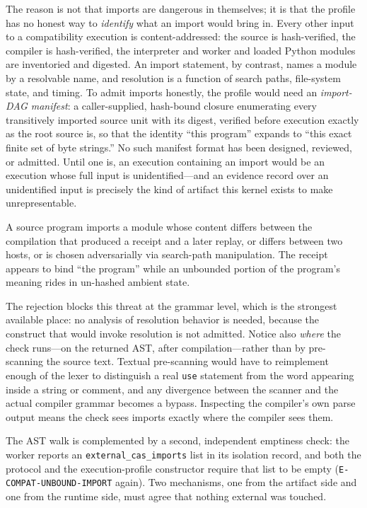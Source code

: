 The reason is not that imports are dangerous in themselves; it is that the profile has no honest way to \emph{identify} what an import would bring in. Every other input to a compatibility execution is content-addressed: the source is hash-verified, the compiler is hash-verified, the interpreter and worker and loaded Python modules are inventoried and digested. An import statement, by contrast, names a module by a resolvable name, and resolution is a function of search paths, file-system state, and timing. To admit imports honestly, the profile would need an \emph{import-DAG manifest}: a caller-supplied, hash-bound closure enumerating every transitively imported source unit with its digest, verified before execution exactly as the root source is, so that the identity ``this program'' expands to ``this exact finite set of byte strings.'' No such manifest format has been designed, reviewed, or admitted. Until one is, an execution containing an import would be an execution whose full input is unidentified---and an evidence record over an unidentified input is precisely the kind of artifact this kernel exists to make unrepresentable.

\begin{threat}\label{ch07:threat:ambient-import}
A source program imports a module whose content differs between the compilation that produced a receipt and a later replay, or differs between two hosts, or is chosen adversarially via search-path manipulation. The receipt appears to bind ``the program'' while an unbounded portion of the program's meaning rides in un-hashed ambient state.
\end{threat}

The rejection blocks this threat at the grammar level, which is the strongest available place: no analysis of resolution behavior is needed, because the construct that would invoke resolution is not admitted. Notice also \emph{where} the check runs---on the returned AST, after compilation---rather than by pre-scanning the source text. Textual pre-scanning would have to reimplement enough of the lexer to distinguish a real \texttt{use} statement from the word appearing inside a string or comment, and any divergence between the scanner and the actual compiler grammar becomes a bypass. Inspecting the compiler's own parse output means the check sees imports exactly where the compiler sees them.

The AST walk is complemented by a second, independent emptiness check: the worker reports an \texttt{external\_cas\_imports} list in its isolation record, and both the protocol and the execution-profile constructor require that list to be empty (\texttt{E-COMPAT-UNBOUND-IMPORT} again). Two mechanisms, one from the artifact side and one from the runtime side, must agree that nothing external was touched.

